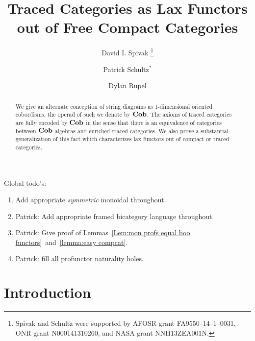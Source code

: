 \documentclass[12pt,oneside,article,draft]{memoir}
\title{Traced Categories as Lax Functors out of Free Compact Categories}
\author{
	David I. Spivak
		\thanks{Spivak and Schultz were supported by AFOSR grant FA9550--14--1--0031, ONR grant N000141310260, and NASA grant NNH13ZEA001N.}
	\and Patrick Schultz${}^*$%
	\and Dylan Rupel
}
\begin{document}
\tightlists
\firmlists

\maketitle
\begin{abstract}
	We give an alternate conception of string diagrams as 1-dimensional oriented cobordisms, the operad of such we denote by $\mathbf{Cob}$.
	The axioms of traced categories are fully encoded by $\mathbf{Cob}$ in the sense that there is an equivalence of categories between $\mathbf{Cob}$-algebras and enriched traced categories.
	We also prove a substantial generalization of this fact which characterizes lax functors out of compact or traced categories.
\end{abstract}
Global todo's:
\begin{enumerate}
	\item Add appropriate {\em symmetric\/} monoidal throughout.
	\item Patrick: Add appropriate framed bicategory language throughout.
	\item Patrick: Give proof of Lemmas~\ref{Lem:mon profs equal boo functors}~and~\ref{lemma:easy compcat}.
	\item Patrick: fill all profunctor naturality holes.
\end{enumerate}
\listoftodos

\setcounter{tocdepth}{1}
\tableofcontents*

\chapter{Introduction}
\end{document}
